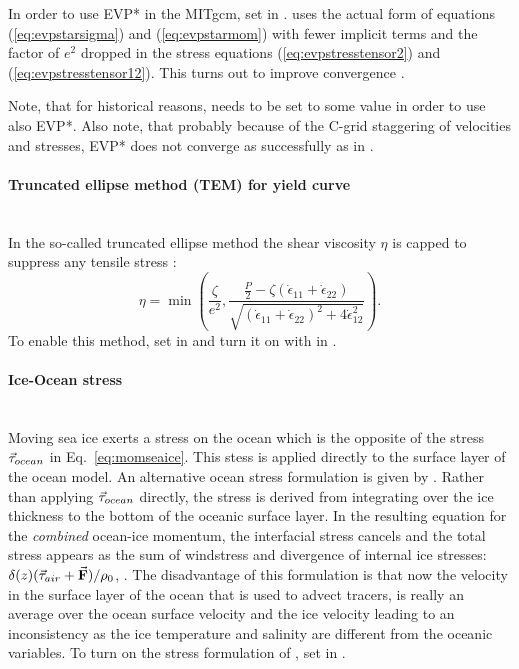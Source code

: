 In order to use EVP* in the MITgcm, set  in .  uses
the actual form of equations (\ref{eq:evpstarsigma}) and
(\ref{eq:evpstarmom}) with fewer implicit terms and the factor of
$e^{2}$ dropped in the stress equations (\ref{eq:evpstresstensor2})
and (\ref{eq:evpstresstensor12}).  This turns out to improve
convergence \citep{bouillon13}.

Note, that for historical reasons,  needs to
be set to some value in order to use also EVP*. Also note, that
probably because of the C-grid staggering of velocities and stresses,
EVP* does not converge as successfully as in \citet{kimmritz15}.


\paragraph{Truncated ellipse method (TEM) for yield curve \label{sec:pkg:seaice:TEM}}~\\
%
In the so-called truncated ellipse method the shear viscosity $\eta$
is capped to suppress any tensile stress \citep{hibler97, geiger98}:
\begin{equation}
  \label{eq:etatem}
  \eta = \min\left(\frac{\zeta}{e^2},
  \frac{\frac{P}{2}-\zeta(\dot{\epsilon}_{11}+\dot{\epsilon}_{22})}
  {\sqrt{(\dot{\epsilon}_{11}+\dot{\epsilon}_{22})^2
      +4\dot{\epsilon}_{12}^2}}\right).
\end{equation}
To enable this method, set  in
 and turn it on with
 in . 

\paragraph{Ice-Ocean stress \label{sec:pkg:seaice:iceoceanstress}}~\\
%
Moving sea ice exerts a stress on the ocean which is the opposite of
the stress $\vec{\mathbf{\mathbf{\tau}}}_{ocean}$ in Eq.~\ref{eq:momseaice}. This stess is
applied directly to the surface layer of the ocean model. An
alternative ocean stress formulation is given by \citet{hibler87}.
Rather than applying $\vec{\mathbf{\mathbf{\tau}}}_{ocean}$ directly, the stress is derived
from integrating over the ice thickness to the bottom of the oceanic
surface layer. In the resulting equation for the \emph{combined}
ocean-ice momentum, the interfacial stress cancels and the total
stress appears as the sum of windstress and divergence of internal ice
stresses: $\delta(z) (\vec{\mathbf{\mathbf{\tau}}}_{air} + \vec{\mathbf{F}})/\rho_0$, \citep[see also
Eq.\,2 of][]{hibler87}. The disadvantage of this formulation is that
now the velocity in the surface layer of the ocean that is used to
advect tracers, is really an average over the ocean surface
velocity and the ice velocity leading to an inconsistency as the ice
temperature and salinity are different from the oceanic variables.
To turn on the stress formulation of \citet{hibler87}, set
 in .


